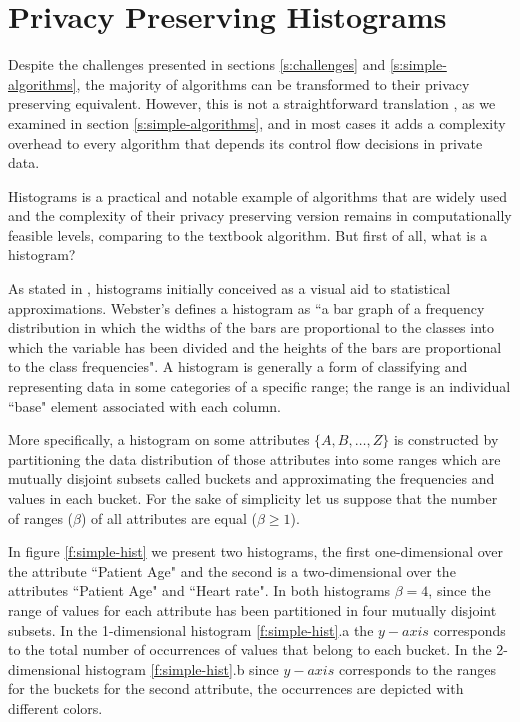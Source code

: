 \section{Privacy Preserving Histograms}\label{s:histograms}
Despite the challenges presented in sections \ref{s:challenges} and \ref{s:simple-algorithms}, the majority of algorithms can be transformed to their privacy preserving equivalent.
However, this is not a straightforward translation , as we examined in section \ref{s:simple-algorithms}, and in most cases it adds a complexity overhead to every algorithm that depends its control flow decisions in private data.

Histograms is a practical and notable example of algorithms that are widely used and the complexity of their privacy preserving version remains in computationally feasible levels, comparing to the textbook algorithm.
But first of all, what is a histogram?

As stated in \cite{ioannidis2003history}, histograms initially conceived as a visual aid to statistical approximations.
Webster’s defines a histogram as ``a bar graph of a frequency distribution in which the widths of the bars are proportional to the classes into which the variable has been divided and the heights of the bars are proportional to the class frequencies".
A histogram is generally a form of classifying and representing data in some categories of a specific range; the range is an individual ``base" element associated with each column.

More specifically, a histogram on some attributes $\{A, B, \dots, Z\}$ is constructed by partitioning the data distribution of those attributes into some ranges which are mutually disjoint subsets called buckets and approximating the frequencies and values in each bucket.
For the sake of simplicity let us suppose that the number of ranges ($\beta$) of all attributes are equal ($\beta \geq 1$).

In figure \ref{f:simple-hist} we present two histograms, the first one-dimensional over the attribute ``Patient Age" and the second is a two-dimensional over the attributes ``Patient Age" and ``Heart rate".
In both histograms $\beta = 4$, since the range of values for each attribute has been partitioned in four mutually disjoint subsets.
In the 1-dimensional histogram \ref{f:simple-hist}.a the $y-axis$ corresponds to the total number of occurrences of values that belong to each bucket.
In the 2-dimensional histogram \ref{f:simple-hist}.b since $y-axis$ corresponds to the ranges for the buckets for the second attribute, the occurrences are depicted with different colors.

